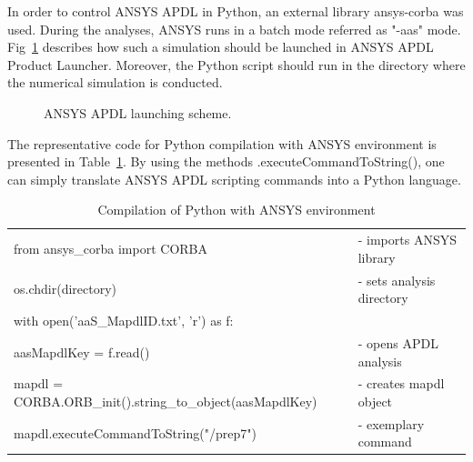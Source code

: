 
In order to control ANSYS APDL in Python, an external library ansys-corba was used. During the analyses, ANSYS runs in a batch mode referred as "-aas" mode. Fig~\ref{fig:ansys_apdl_launching_scheme} describes how such a simulation should be launched in ANSYS APDL Product Launcher. Moreover, the Python script should run in the directory where the numerical simulation is conducted.

\begin{figure}[H]
    \centering
    \caption{ANSYS APDL launching scheme.}
    \label{fig:ansys_apdl_launching_scheme}
\end{figure}

The representative code for Python compilation with ANSYS environment is presented in Table~\ref{table:ansys_python_compilation}. By using the methods .executeCommandToString(), one can simply translate ANSYS APDL scripting commands into a Python language.

\begin{table}[h!]
    \caption{Compilation of Python with ANSYS environment} 
    \vspace{-1em} 
    \fontsize{10}{10}
    \selectfont 
    \renewcommand{\arraystretch}{1}
    \begin{center}
    \begin{tabular}{ ll }  
    \hline  
        from ansys\_corba import CORBA & - imports ANSYS library \\
        os.chdir(directory) & - sets analysis directory\\
        with open('aaS\_MapdlID.txt', 'r') as f: \\ aasMapdlKey = f.read() & - opens APDL analysis \\
        mapdl = CORBA.ORB\_init().string\_to\_object(aasMapdlKey) & - creates mapdl object \\
    \hline
        mapdl.executeCommandToString("/prep7") & - exemplary command \\
     \end{tabular} 
    \end{center}  
     \label{table:ansys_python_compilation} 
 \end{table}
